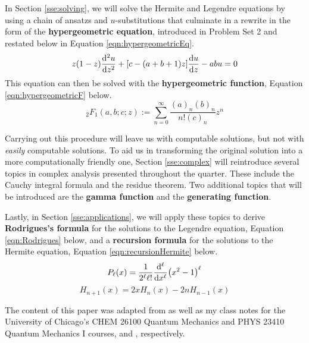 \documentclass[titlepage]{article}
\numberwithin{equation}{section}
\begin{document}
In Section \ref{sse:solving}, we will solve the Hermite and Legendre equations by using a chain of ansatzs and $u$-substitutions that culminate in a rewrite in the form of the \textbf{hypergeometric equation}, introduced in Problem Set 2 and restated below in Equation \ref{eqn:hypergeometricEq}.
\begin{equation}\label{eqn:hypergeometricEq}
    z(1-z)\dv[2]{u}{z}+[c-(a+b+1)z]\dv{u}{z}-abu = 0
\end{equation}
This equation can then be solved with the \textbf{hypergeometric function}, Equation \ref{eqn:hypergeometricF} below.
\begin{equation}\label{eqn:hypergeometricF}
    {}_2F_1(a,b;c;z) := \sum_{n=0}^\infty\frac{(a)_n(b)_n}{n!(c)_n}z^n
\end{equation}\par
Carrying out this procedure will leave us with computable solutions, but not with \emph{easily} computable solutions. To aid us in transforming the original solution into a more computationally friendly one, Section \ref{sse:complex} will reintroduce several topics in complex analysis presented throughout the quarter. These include the Cauchy integral formula and the residue theorem. Two additional topics that will be introduced are the \textbf{gamma function} and the \textbf{generating function}.\par
Lastly, in Section \ref{sse:applications}, we will apply these topics to derive \textbf{Rodrigues's formula} for the solutions to the Legendre equation, Equation \ref{eqn:Rodrigues} below, and a \textbf{recursion formula} for the solutions to the Hermite equation, Equation \ref{eqn:recursionHermite} below.
\begin{equation}\label{eqn:Rodrigues}
    P_\ell(x) = \frac{1}{2^\ell\ell!}\dv[\ell]{x}(x^2-1)^\ell
\end{equation}
\begin{equation}\label{eqn:recursionHermite}
    H_{n+1}(x) = 2xH_n(x)-2nH_{n-1}(x)
\end{equation}\par
The content of this paper was adapted from \textcite{bib:Seaborn} as well as my class notes for the University of Chicago's CHEM 26100 Quantum Mechanics and PHYS 23410 Quantum Mechanics I courses, \textcite{bib:CHEM26100Notes} and \textcite{bib:PHYS23410Notes}, respectively.
\newpage



\renewcommand{\leftmark}{\firstmark}
\renewcommand{\sectionmark}[1]{\markboth{Section \thesection\ (#1)}{}}
\renewcommand{\subsectionmark}[1]{}
\end{document}

